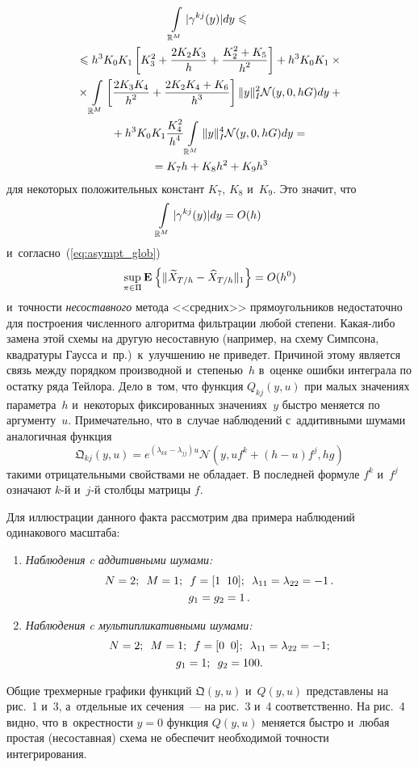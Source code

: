 \begin{multicols}{2}
\noindent
 \begin{multline*} %
 \int\limits_{\mathbb{R}^M}|\gamma^{kj}(y)|dy \leqslant{}\\
 {}\leqslant h^3 K_0K_1
 \left[
 K_3^2 + \fr{2K_2K_3}{h} + \fr{K_2^2+K_5}{h^2}
 \right] + h^3 K_0K_1\times{}\\
 {}\times
 \int\limits_{\mathbb{R}^M}
 \left[
 \fr{2K_3K_4}{h^2} + \fr{2K_2K_4+K_6}{h^3}
 \right]
 \|y\|^2_I
 \mathcal{N}(y,0,hG)dy
 + {}\\ 
{}+ 
 h^3 K_0K_1\fr{K_4^2}{h^4}
 \int\limits_{\mathbb{R}^M}
 \|y\|^4_I
 \mathcal{N}(y,0,hG)dy ={}\\
 {}= K_7h + K_8h^2 +K_9h^3
 \end{multline*}
 для некоторых положительных констант $K_7$, $K_8$ и~$K_9$. Это значит, 
что 
$$
\int\limits_{\mathbb{R}^M}|\gamma^{kj}(y)|dy \hm= O(h)
$$ 
и~согласно~(\ref{eq:asympt_glob}) 
$$
\sup\limits_{\pi \in 
\Pi}\me{}{\|\widetilde{X}_{T/h} - \widehat{X}_{T/h}\|_1}\hm = O(h^0)
$$ 
и~точности \textit{несоставного} метода <<средних>> прямоугольников 
недостаточно для построения численного алгоритма фильтрации любой 
степени. Какая-либо замена этой схемы на другую несоставную (например, на 
схему Симпсона, квадратуры Гаусса и~пр.)\ к~улучшению не приведет. 
Причиной этому является связь между порядком производной и~степенью~$h$ 
в~оценке ошибки интеграла по остатку ряда Тейлора.
 Дело в~том, что функция $Q_{kj}(y,u)$ при малых значениях параметра~$h$ 
и~некоторых фиксированных значениях~$y$ быстро меняется по аргументу~$u$. 
Примечательно, что в~случае наблюдений с~аддитивными 
шумами~\cite{B_20_2_IA} аналогичная функция
 $$
\mathfrak{Q}_{kj}(y,u) = e^{(\lambda_{kk}-\lambda_{jj})u}
 \mathcal{N}\left(y,u f^k+(h-u)f^j, h g\right)
$$
 такими отрицательными свойствами не обладает. В последней формуле $f^k$ 
и~$f^j$ означают $k$-й и~$j$-й столбцы матрицы $f$.

 Для иллюстрации данного факта рассмотрим два примера наблюдений 
одинакового масштаба:
 \begin{enumerate}
 \item
 \textit{Наблюдения c аддитивными шумами:}
 \begin{gather*}
N = 2;\enskip M = 1; \enskip f = [1\;\; 10]; \enskip 
\lambda_{11}=\lambda_{22}=-1\,. \\ 
g_1=g_2=1\,.
\end{gather*}
 \item
 \textit{Наблюдения c мультипликативными шумами:}
 \begin{gather*}
N = 2;\enskip M = 1; \enskip f = [0\;\; 0 ]; \enskip 
\lambda_{11}=\lambda_{22}=-1; \\
 g_1=1;\enskip g_2=100.
\end{gather*}
 \end{enumerate}
 Общие трехмерные графики функций $\mathfrak{Q}(y,u)$ и~$Q(y,u)$ 
представлены на рис.~1 и~3, а~отдельные их 
сечения~--- на рис.~3 и~4 соответственно. На 
рис.~4 видно, что в~окрестности $y=0$ функция $Q(y,u)$ 
меняется быстро и~любая простая (несоставная) схема не обеспечит 
необходимой точности интегрирования.
 


\end{multicols}
